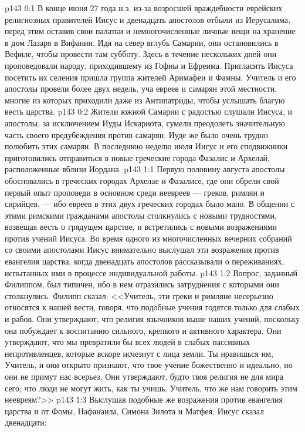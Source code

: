 \vs p143 0:1 В конце июня 27 года н.э. из\hyp{}за возросшей враждебности еврейских религиозных правителей Иисус и двенадцать апостолов отбыли из Иерусалима, перед этим оставив свои палатки и немногочисленные личные вещи на хранение в дом Лазаря в Вифании. Идя на север вглубь Самарии, они остановились в Вефиле, чтобы провести там субботу. Здесь в течение нескольких дней они проповедовали народу, приходившему из Гофны и Ефреима. Пригласить Иисуса посетить их селения пришла группа жителей Аримафеи и Фамны. Учитель и его апостолы провели более двух недель, уча евреев и самарян этой местности, многие из которых приходили даже из Антипатриды, чтобы услышать благую весть царства.
\vs p143 0:2 Жители южной Самарии с радостью слушали Иисуса, и апостолы, за исключением Иуды Искариота, сумели преодолеть значительную часть своего предубеждения против самарян. Иуде же было очень трудно полюбить этих самарян. В последнюю неделю июля Иисус и его сподвижники приготовились отправиться в новые греческие города Фазалис и Архелай, расположенные вблизи Иордана.
\vs p143 1:1 Первую половину августа апостолы обосновались в греческих городах Архелае и Фазалисе, где они обрели свой первый опыт проповеди в основном среди неевреев --- греков, римлян и сирийцев, --- ибо евреев в этих двух греческих городах было мало. В общении с этими римскими гражданами апостолы столкнулись с новыми трудностями, возвещая весть о грядущем царстве, и встретились с новыми возражениями против учений Иисуса. Во время одного из многочисленных вечерних собраний со своими апостолами Иисус внимательно выслушал эти возражения против евангелия царства, когда двенадцать апостолов рассказывали о переживаниях, испытанных ими в процессе индивидуальной работы.
\vs p143 1:2 Вопрос, заданный Филиппом, был типичен, ибо в нем отразились затруднения с которыми они столкнулись. Филипп сказал: <<Учитель, эти греки и римляне несерьезно относятся к нашей вести, говоря, что подобные учения годятся только для слабых и рабов. Они утверждают, что религия язычников выше наших учений, поскольку она побуждает к воспитанию сильного, крепкого и активного характера. Они утверждают, что мы превратили бы всех людей в слабых пассивных непротивленцев, которые вскоре исчезнут с лица земли. Ты нравишься им, Учитель, и они открыто признают, что твое учение божественно и идеально, но они не примут нас всерьез. Они утверждают, будто твоя религия не для мира сего; что люди не могут жить, как ты учишь. Учитель, что же нам говорить этим неевреям?>>
\vs p143 1:3 Выслушав подобные же возражения против евангелия царства и от Фомы, Нафанаила, Симона Зилота и Матфея, Иисус сказал двенадцати:
